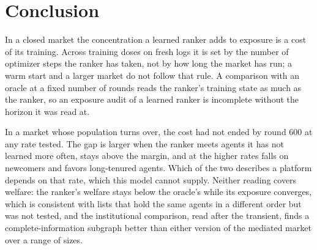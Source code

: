 
\section{Conclusion}
\label{sec:conclusion}

In a closed market the concentration a learned ranker adds to exposure is a cost
of its training. Across training doses on fresh logs it is set by the number of optimizer
steps the ranker has taken, not by how long the market has run; a warm start and a
larger market do not follow that rule. A comparison with an oracle at a fixed
number of rounds reads the ranker's training state as much as the ranker, so an
exposure audit of a learned ranker is incomplete without the horizon it was read
at.

In a market whose population turns over, the cost had not ended by round 600 at
any rate tested. The gap is larger when the ranker meets agents it has not learned
more often, stays above the margin, and at the higher rates falls on newcomers and
favors long-tenured agents.
Which of the two describes a platform depends on that rate, which this model
cannot supply. Neither reading covers welfare: the ranker's welfare stays below the oracle's
while its exposure converges, which is consistent with lists that hold the same
agents in a different order but was not tested, and the institutional comparison,
read after the transient, finds a complete-information subgraph better than either
version of the mediated market over a range of sizes.
